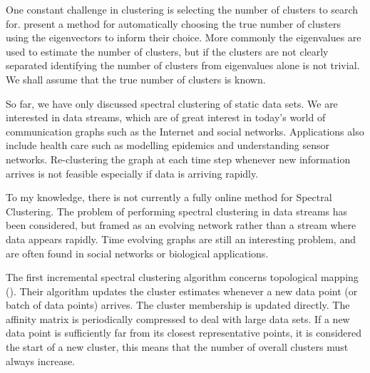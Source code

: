One constant challenge in clustering is selecting the number of clusters to search for. \cite{Zelnik-Manor2004} present a method for automatically choosing the true number of clusters using the eigenvectors to inform their choice. More commonly the eigenvalues are used to estimate the number of clusters, but if the clusters are not clearly separated identifying the number of clusters from eigenvalues alone is not trivial. We shall assume that the true number of clusters is known. 

So far, we have only discussed spectral clustering of static data sets. We are interested in data streams, which are of great interest in today's world of communication graphs such as the Internet and social networks. Applications also include health care such as modelling epidemics and understanding sensor networks. Re-clustering the graph at each time step whenever new information arrives is not feasible especially if data is arriving rapidly.

To my knowledge, there is not currently a fully online method for Spectral Clustering. The problem of performing spectral clustering in data streams has been considered, but framed as an evolving network rather than a stream where data appears rapidly. Time evolving graphs are still an interesting problem, and are often found in social networks or biological applications. 

 The first incremental spectral clustering algorithm concerns topological mapping (\cite{Valgren2007}). Their algorithm updates the cluster estimates whenever a new data point (or batch of data points) arrives. The cluster membership is updated directly. The affinity matrix is periodically compressed to deal with large data sets. If a new data point is sufficiently far from its closest representative points, it is considered the start of a new cluster, this means that the number of overall clusters  must always increase. 

